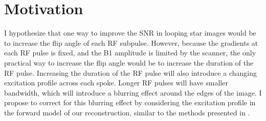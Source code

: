 \documentclass[11pt]{article}
\begin{document}
\section*{Motivation}
I hypothesize that one way to improve the SNR in looping star images would be to increase the flip angle of each RF subpulse.
However, because the gradients at each RF pulse is fixed, and the B1 amplitude is limited by the scanner,
the only practical way to increase the flip angle would be to increase the duration of the RF pulse.
Increasing the duration of the RF pulse will also introduce a changing excitation profile across each spoke.
Longer RF pulses will have smaller bandwidth, which will introduce a blurring effect around the edges of the image.
I propose to correct for this blurring effect by considering the excitation profile in the forward model of our reconstruction,
similar to the methods presented in \cite{Li2014}.
\end{document}
